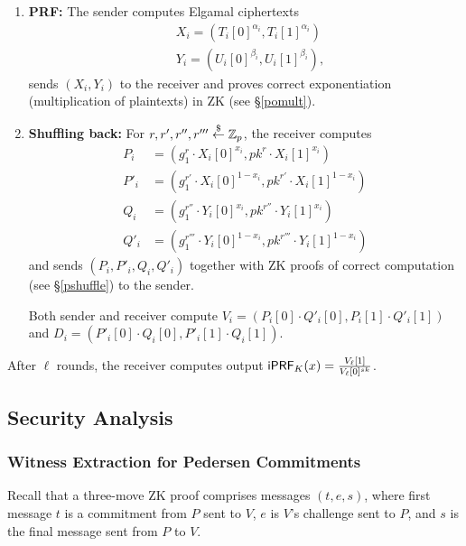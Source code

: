 \begin{enumerate}
\item {\bf PRF:} The sender computes Elgamal ciphertexts
  \begin{align*}
&X_i=(T_i[0]^{\alpha_i},T_i[1]^{\alpha_i})
\\&Y_i=(U_i[0]^{\beta_i},U_i[1]^{\beta_i}),
  \end{align*}
sends $(X_i,Y_i)$ to the receiver and proves correct exponentiation
(multiplication of plaintexts) in ZK (see \S\ref{pomult}).

\item {\bf Shuffling back:}
  For $r,r',r'',r'''\stackrel{\$}{\leftarrow}\mathbb{Z}_p$, the receiver computes
  \begin{align*}
    P_i&=(g_1^r\cdot{}X_i[0]^{x_i},pk^r\cdot{}X_i[1]^{x_i})
    \\P'_i&=(g_1^{r'}\cdot{}X_i[0]^{1-x_i},pk^{r'}\cdot{}X_i[1]^{1-x_i})
   \\Q_i&=(g_1^{r''}\cdot{}Y_i[0]^{x_i},pk^{r''}\cdot{}Y_i[1]^{x_i})
   \\Q'_i&=(g_1^{r'''}\cdot{}Y_i[0]^{1-x_i},pk^{r'''}\cdot{}Y_i[1]^{1-x_i})
  \end{align*} 
  and sends $(P_i,P'_i,Q_i,Q'_i)$ together with ZK proofs of correct
  computation (see \S\ref{pshuffle}) to the sender.

  Both sender and receiver compute
  $V_i=(P_i[0]\cdot{}Q'_i[0],P_i[1]\cdot{}Q'_i[1])$ and
  $D_i=(P'_i[0]\cdot{}Q_i[0],P'_i[1]\cdot{}Q_i[1])$.
  
\end{enumerate}

After $\ell$ rounds, the receiver computes output
$\mathsf{i}\mathsf{PRF}_K(x)=\frac{V_\ell[1]}{V_{\ell}[0]^{sk}}$.


\subsection{Security Analysis}
 

\subsubsection{Witness Extraction for Pedersen Commitments}
Recall that a three-move ZK proof comprises messages $(t,e,s)$, where
first message $t$ is a commitment from $P$ sent to $V$, $e$ is $V$'s
challenge sent to $P$, and $s$ is the final message sent from $P$ to
$V$.

